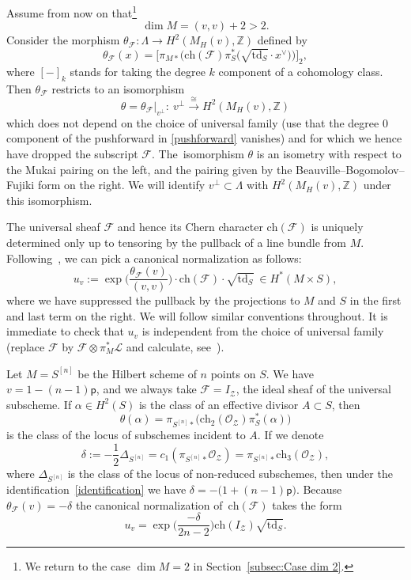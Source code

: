 \documentclass[11pt]{article}
\numberwithin{equation}{section}
\numberwithin{equation}{section}
\newcommand{\BZ}{{\mathbb{Z}}}
\newcommand{\CF}{{\mathcal F}}
\newcommand{\CL}{{\mathcal L}}
\newcommand{\CO}{{\mathcal O}}
\newcommand{\CZ}{{\mathcal Z}}
\newcommand{\pt}{{\mathsf{p}}}
\newcommand{\ch}{{\mathrm{ch}}}
\newcommand{\td}{{\mathrm{td}}}
\newcommand{\1}{\mathsf{1}}
\begin{document}
Assume from now on that\footnote{We return to the case $\dim M = 2$ in Section~\ref{subsec:Case dim 2}.}
\[
\dim M = (v,v) + 2 > 2.
\]
Consider the morphism $\theta_{\CF} \colon \Lambda \to H^2(M_H(v),\BZ)$ defined by
\begin{equation}
\theta_{\CF}(x) = \big[ \pi_{M \ast}\big( \ch(\CF)
\pi_S^{\ast}\big( \sqrt{\td_S} \cdot x^{\vee}  \big) \big) \big]_{2},
\label{pushforward} \end{equation}
where $[ - ]_{k}$ stands for taking the degree $k$ component of a cohomology class.
Then $\theta_{\CF}$ restricts to an isomorphism
\begin{equation}
\theta = \theta_{\CF}|_{v^{\perp}} \colon \ v^{\perp} \xrightarrow{\cong} H^2(M_H(v),\BZ) \label{identification}
\end{equation}
which does not depend on the choice of universal family (use that the degree $0$ component of the pushforward in \eqref{pushforward} vanishes)
and for which we hence have dropped the subscript $\CF$.
The~isomorphism $\theta$ is an isometry with respect to the Mukai pairing on the left, and the pairing given by the Beauville--Bogomolov--Fujiki form on the right.
We will identify $v^{\perp} \subset \Lambda$ with $H^2(M_{H}(v),\BZ)$ under this isomorphism.

The universal sheaf $\CF$ and hence its Chern character $\ch(\CF)$ is uniquely determined only up to tensoring by the pullback of a line bundle from $M$.
Following~\cite{Markman}, we can pick a canonical normalization as follows:
\[
u_v := \exp\bigg( \frac{\theta_{\CF}(v) }{(v,v)} \bigg) \cdot \ch(\CF) \cdot \sqrt{\td_S} \ \in H^{\ast}(M \times S),
\]
where we have suppressed the pullback by the projections to $M$ and $S$ in the first and last term on the right.
We will follow similar conventions throughout.
It is immediate to check that $u_v$ is independent from the choice of universal family (replace $\CF$ by $\CF \otimes \pi_M^{\ast} \CL$ and calculate, see~\cite[Lemma~3.1]{Markman}).


\begin{Example} %
Let $M = S^{[n]}$ be the Hilbert scheme of $n$ points on $S$. We have $v=1-(n-1) \pt$,
and we always take $\CF = I_{\CZ}$, the ideal sheaf of the universal subscheme.
If $\alpha \in H^2(S)$ is the class of an effective divisor $A \subset S$, then
\[
\theta(\alpha) = \pi_{S^{[n]} \ast}\big(\ch_2(\CO_{\CZ}) \pi_S^{\ast}(\alpha)\big)
\]
is the class of the locus of subschemes incident to $A$.
If we denote
\[
\delta := -\frac{1}{2} \Delta_{S^{[n]}} = c_1( \pi_{S^{[n]} \ast} \CO_{\CZ} ) = \pi_{S^{[n]} \ast} \ch_3(\CO_{\CZ}),
\]
where $\Delta_{S^{[n]}}$ is the class of the locus of non-reduced subschemes, then
under the identification~\eqref{identification} we have
$\delta = - \big( 1 + (n-1) \pt \big)$.
Because $\theta_{\CF}(v)=-\delta$ the canonical normalization of~$\ch(\CF)$ takes the form
\[
u_v = \exp\bigg( \frac{-\delta}{2n-2} \bigg) \ch(I_{\CZ}) \sqrt{\td_S}.
\]
\end{Example}
\end{document}
